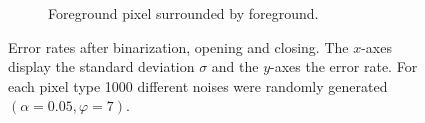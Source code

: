\begin{figure}[H]
\begin{subfigure}[t]{0.48\linewidth}
		\caption{Foreground pixel surrounded by foreground.}
		\label{fig: alpha0.05_phi7_foreground_free}
	\end{subfigure}
	\caption{Error rates after binarization, opening and closing. The $x$-axes display the standard deviation $\sigma$ and the $y$-axes the error rate. For each pixel type 1000 different noises were randomly generated $(\alpha = 0.05, \varphi = 7)$.}
	\label{fig: alpha0.05_phi7}
\end{figure}